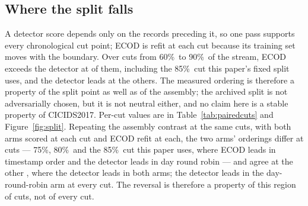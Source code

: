 \documentclass[manuscript,anonymous,review]{acmart}
\begin{document}
\subsection{Where the split falls}
A detector score depends only on the records preceding it, so one pass supports
every chronological cut point; ECOD is refit at each cut because its training
set moves with the boundary. Over \RevSplitCuts{} cuts from 60\%\ to 90\%\ of
the stream, ECOD exceeds the detector at \RevSplitEcodWins{} of them, including
the 85\%\ cut this paper's fixed split uses, and the detector leads at the
others. The measured ordering is therefore a property of the split point as well
as of the assembly; the archived split is not adversarially chosen, but it is
not neutral either, and no claim here is a stable property of CICIDS2017.
Per-cut values are in Table~\ref{tab:pairedcuts} and Figure~\ref{fig:split}.
Repeating the assembly contrast at the same \RefPairedCuts{} cuts, with both
arms scored at each cut and ECOD refit at each, the two arms' orderings differ
at \RefPairedCutsOrderingsDiffer{} cuts --- 75\%, 80\%\ and the 85\%\ cut this
paper uses, where ECOD leads in timestamp order and the detector leads in day
round robin --- and agree at the other \RefPairedCutsOrderingsAgree, where the
detector leads in both arms; the detector leads in the day-round-robin arm at
every cut. The reversal is therefore a property of this region of cuts, not of
every cut.
\end{document}
